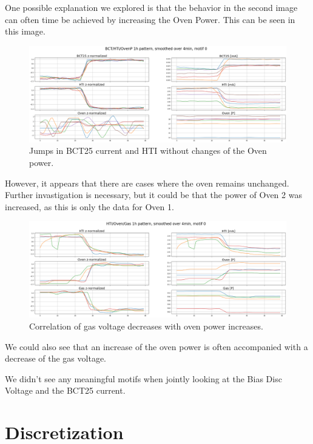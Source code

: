 \documentclass[12pt,a4paper]{article}
\begin{document}
One possible explanation we explored is that the behavior in the second image can often time be achieved by increasing the Oven Power. This can be seen in this image.

\begin{figure}
\centering
\includegraphics{images/bct_oven_hti_2dim.png}
\caption{Jumps in BCT25 current and HTI without changes of the Oven power.}
\end{figure}

However, it appears that there are cases where the oven remains unchanged. Further invastigation is necessary, but it could be that the
power of Oven 2 was increased, as this is only the data for Oven 1.

\begin{figure}
\centering
\includegraphics{images/gas_oven_hti.png}
\caption{Correlation of gas voltage decreases with oven power increases.}
\end{figure}

We could also see that an increase of the oven power is often accompanied with a decrease of the gas voltage.

We didn't see any meaningful motifs when jointly looking at the Bias Disc Voltage and the BCT25 current.

\hypertarget{discretization}{%
\section{Discretization}\label{discretization}}
\end{document}
